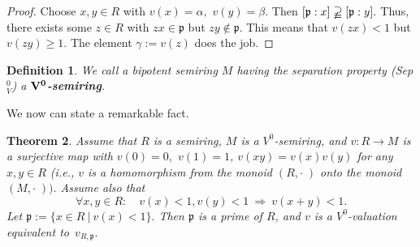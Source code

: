 \documentclass [12pt,a4paper,reqno]{amsart}
\newtheorem{thm}{Theorem} [section]
\newtheorem{defn}[thm]{Definition}
\begin{document}
\begin{proof}
Choose $x,y\in R$ with  $v(x)={\alpha} ,$ $v(y)={\beta} .$ Then $[{\mathfrak p}
:x]\varsupsetneqq[{\mathfrak p}:  y].$ Thus, there exists some $z\in R$
with $zx\in{\mathfrak p} $ but $zy\notin {\mathfrak p} .$ This means that $v(zx)<1$
but $v(zy)\ge1.$ The element ${\gamma} :=v(z)$ does the job.\end{proof}

\begin{defn}\label{defn1.10}
We call a bipotent semiring $M$ having the separation property
 {\rm (Sep}$^0_V${\rm)} a
{\textbf{{${\bf {V^0}}$-semiring}}}.\end{defn}

We now can state a remarkable fact.

\begin{thm}\label{thm1.11}
Assume that $R$ is a semiring, $M$ is a ${V^0}$-semiring, and
$v:R\to M$ is  a surjective map with $v(0)=0,$ $v(1)=1$,
$v(xy)=v(x)v(y)$ for any $x,y\in R$ (i.e., $v$ is a homomorphism
from the monoid $(R,\cdot \; )$ onto the monoid $(M,\cdot \; )).$
Assume also that
\begin{equation}\label{1.1}
\forall x,y\in R:\quad  v(x)<1,v(y)<1\ \Rightarrow\ v(x+y)<1.
\end{equation}
Let ${\mathfrak p} :=\{x\in R {\ {|} \ }v(x)<1\}.$ Then ${\mathfrak p}$ is a prime of
$R$, and $v$ is a ${V^0}$-valuation equivalent to~$v_{R,{\mathfrak p} }.$
\end{thm}
\end{document}
